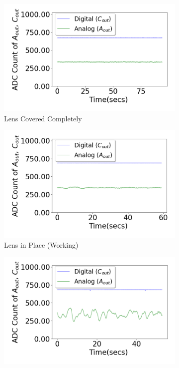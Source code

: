 \begin{figure}%
	\centering
	\begin{subfigure}[t]{0.33\linewidth}
		\centering
		\includegraphics[width=\textwidth]{figures/pir/lens_fault/BuildSys_Graphs/CapCovered_NoObstacle.png}
		\caption{Lens Covered Completely}
		\label{fig:capcovered}
	\end{subfigure}
	\begin{subfigure}[t]{0.33\linewidth}
		\centering
		\includegraphics[width=\textwidth]{figures/pir/lens_fault/BuildSys_Graphs/CapON_NoObstacle.png}
		\caption{Lens in Place (Working)}
		\label{fig:capon}
	\end{subfigure}
	\begin{subfigure}[t]{0.33\linewidth}
		\centering
		\includegraphics[width=\linewidth]{figures/pir/lens_fault/BuildSys_Graphs/CapOff_NoObstacle.png}

\end{subfigure}
\end{figure}
